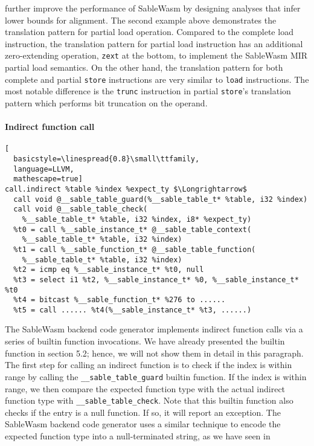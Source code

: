 further improve the performance of SableWasm by designing analyses that infer
lower bounds for alignment. The second example above demonstrates the
translation pattern for partial load operation. Compared to the complete load
instruction, the translation pattern for partial load instruction has an
additional zero-extending operation, \texttt{zext} at the bottom, to implement
the SableWasm MIR partial load semantics. On the other hand, the translation
pattern for both complete and partial \texttt{store} instructions are very
similar to \texttt{load} instructions. The most notable difference is the
\texttt{trunc} instruction in partial \texttt{store}'s translation pattern
which performs bit truncation on the operand.

\paragraph{Indirect function call} \quad
\begin{lstlisting}[
  basicstyle=\linespread{0.8}\small\ttfamily, 
  language=LLVM, 
  mathescape=true]
call.indirect %table %index %expect_ty $\Longrightarrow$ 
  call void @__sable_table_guard(%__sable_table_t* %table, i32 %index)
  call void @__sable_table_check(
    %__sable_table_t* %table, i32 %index, i8* %expect_ty)
  %t0 = call %__sable_instance_t* @__sable_table_context(
    %__sable_table_t* %table, i32 %index)
  %t1 = call %__sable_function_t* @__sable_table_function(
    %__sable_table_t* %table, i32 %index)
  %t2 = icmp eq %__sable_instance_t* %t0, null
  %t3 = select i1 %t2, %__sable_instance_t* %0, %__sable_instance_t* %t0
  %t4 = bitcast %__sable_function_t* %276 to ......
  %t5 = call ...... %t4(%__sable_instance_t* %t3, ......)
\end{lstlisting}
The SableWasm backend code generator implements indirect function calls via a
series of builtin function invocations. We have already presented the builtin
function in section 5.2; hence, we will not show them in detail in this
paragraph. The first step for calling an indirect function is to check if the
index is within range by calling the \texttt{\_\_sable\_table\_guard} builtin
function. If the index is within range, we then compare the expected function
type with the actual indirect function type with
\texttt{\_\_sable\_table\_check}. Note that this builtin function also checks
if the entry is a null function. If so, it will report an exception. The
SableWasm backend code generator uses a similar technique to encode the
expected function type into a null-terminated string, as we have seen in
